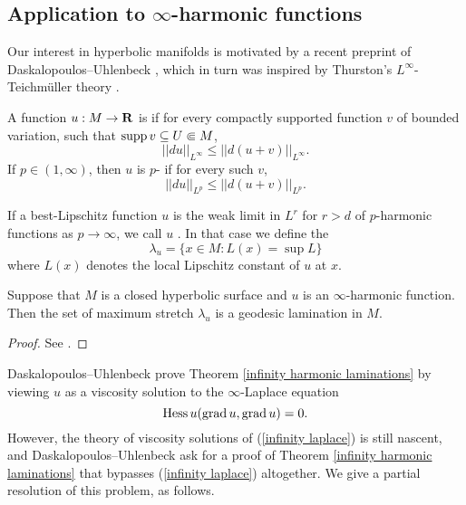 
\subsection{Application to \texorpdfstring{$\infty$}{infinity}-harmonic functions}
Our interest in hyperbolic manifolds is motivated by a recent preprint of Daskalopoulos--Uhlenbeck \cite{daskalopoulos2020transverse}, which in turn was inspired by Thurston's $L^\infty$-Teichm\"uller theory \cite{thurston1998minimal}.

\begin{definition}
A function $u: M \to \mathbf{R}$ is  if for every compactly supported function $v$ of bounded variation, such that $\operatorname{supp} v \subseteq U \Subset M$,
$$||du||_{L^\infty} \leq ||d(u + v)||_{L^\infty}.$$
If $p \in (1, \infty)$, then $u$ is $p$- if for every such $v$,
$$||du||_{L^p} \leq ||d(u + v)||_{L^p}.$$
\end{definition}

\begin{definition}
If a best-Lipschitz function $u$ is the weak limit in $L^r$ for $r > d$ of $p$-harmonic functions as $p \to \infty$, we call $u$ .
In that case we define the 
$$\lambda_u = \{x \in M: L(x) = \sup L\}$$
where $L(x)$ denotes the local Lipschitz constant of $u$ at $x$.
\end{definition}

\begin{theorem}\label{infinity harmonic laminations}
Suppose that $M$ is a closed hyperbolic surface and $u$ is an $\infty$-harmonic function. Then the set of maximum stretch $\lambda_u$ is a geodesic lamination in $M$.
\end{theorem}
\begin{proof}
See \cite[\S5]{daskalopoulos2020transverse}.
\end{proof}

Daskalopoulos--Uhlenbeck prove Theorem \ref{infinity harmonic laminations} by viewing $u$ as a viscosity solution to the $\infty$-Laplace equation
\begin{equation}\label{infinity laplace}
    \operatorname{Hess} u(\operatorname{grad} u, \operatorname{grad} u) = 0.
\end{equation}
However, the theory of viscosity solutions of (\ref{infinity laplace}) \cite{Aronsson1984} \cite{Evans08} is still nascent, and Daskalopoulos--Uhlenbeck ask for a proof of Theorem \ref{infinity harmonic laminations} that bypasses (\ref{infinity laplace}) altogether.
We give a partial resolution of this problem, as follows.

